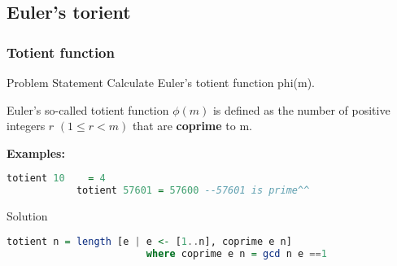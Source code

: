 \subsection{Euler's torient}
\begin{frame}[fragile]\frametitle{Totient function}

\begin{block}{Problem Statement}
Calculate Euler's totient function phi(m).

Euler's so-called totient function $\phi(m)$ is defined as the number of
positive integers $r$ $(1 \leq r < m)$ that are \textbf{coprime} to m.
\end{block} \pause
\textbf{Examples:}
\begin{lstlisting}[language=Haskell,basicstyle=\footnotesize\ttfamily]
			totient 10 	  = 4 
			totient 57601 = 57600 --57601 is prime^^
		\end{lstlisting}
\pause
\begin{alertblock}{Solution}
			\begin{lstlisting}[language=Haskell,basicstyle=\footnotesize\ttfamily]
					totient n = length [e | e <- [1..n], coprime e n]
						where coprime e n = gcd n e ==1
		\end{lstlisting}
\end{alertblock}	

\end{frame}
